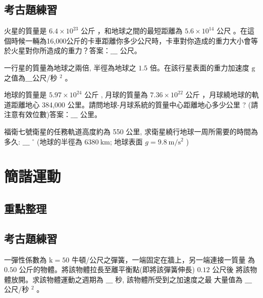 \documentclass[cn,10pt,math=newtx,chinesefont=founder]{../elegantbook}
\begin{document}
\subsection{考古題練習}
\begin{example}
    火星的質量是 $6.4 \times 10^{23}$ 公斤 ，和地球之間的最短距離為 $5.6 \times 10^{14}$ 公尺 。在這 個時候一輛為16,000公斤的卡車距離你多少公尺時，卡車對你造成的重力大小會等於火星對你所造成的重力？答案：$\_\_\_$ 公尺。
\end{example}
\begin{solution}

\end{solution}
\vspace{6cm}
\begin{example}
    一行星的質量為地球之兩倍, 半徑為地球之 $1.5$ 倍。在該行星表面的重力加速度 $\mathrm{g}$ 之值為$\_\_\_$公尺/秒 $^{2}$ 。
\end{example}
\begin{solution}
\end{solution}
\vspace{6cm}

\begin{example}
    地球的質量是 $5.97 \times 10^{24}$ 公斤 , 月球的質量為 $7.36 \times 10^{22}$ 公斤 ，月球繞地球的軌道距離地心 384,000 公里。請問地球-月球系統的質量中心距離地心多少公里 ? (請注意有效位數)答案：$\_\_\_$ 公里。
\end{example}
\begin{solution}
    
\end{solution}
\vspace{6cm}
\begin{example}
    福衛七號衛星的任務軌道高度約為 550 公里, 求衛星繞行地球一周所需要的時間為多久: $\_\_\_$ $^{\circ}$ (地球的半徑為 $6380 \mathrm{~km}$; 地球表面 $g=9.8 \mathrm{~m} / \mathrm{s}^{2}$ )
\end{example}
\begin{solution}

\end{solution}
\vspace{6cm}
\section{簡諧運動}
\subsection{重點整理}
\newpage
\subsection{考古題練習}
\begin{example}
    一彈性係數為 $\mathrm{k}=50$ 牛頓/公尺之彈簧，一端固定在牆上，另一端連接一質量 為 $0.50$ 公斤的物體。將該物體拉長至離平衡點(即將該彈簧伸長) $0.12$ 公尺後 將該物體放開。求該物體運動之週期為 $\_\_\_$ 秒, 該物體所受到之加速度之最 大量值為 $\_\_\_$ 公尺/秒 $^{2}$ 。
\end{example}
\begin{solution}

\end{solution}
\vspace{6cm}
\end{document}
